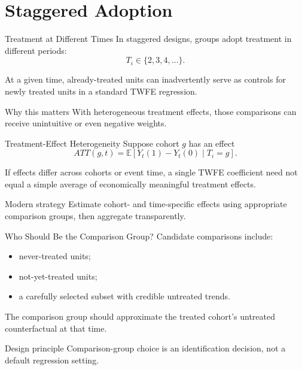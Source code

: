 \documentclass[aspectratio=169,11pt]{beamer}
\newcommand{\E}{\mathbb{E}}
\begin{document}
\section{Staggered Adoption}

\begin{frame}{Treatment at Different Times}
In staggered designs, groups adopt treatment in different periods:
\[
T_i\in\{2,3,4,\ldots\}.
\]

At a given time, already-treated units can inadvertently serve as controls for newly treated units in a standard TWFE regression.

\begin{alertblock}{Why this matters}
With heterogeneous treatment effects, those comparisons can receive unintuitive or even negative weights.
\end{alertblock}
\end{frame}

\begin{frame}{Treatment-Effect Heterogeneity}
Suppose cohort \(g\) has an effect
\[
ATT(g,t)
=
\E[Y_t(1)-Y_t(0)\mid T_i=g].
\]

If effects differ across cohorts or event time, a single TWFE coefficient need not equal a simple average of economically meaningful treatment effects.

\begin{block}{Modern strategy}
Estimate cohort- and time-specific effects using appropriate comparison groups, then aggregate transparently.
\end{block}
\end{frame}

\begin{frame}{Who Should Be the Comparison Group?}
Candidate comparisons include:
\begin{itemize}
\item never-treated units;
\item not-yet-treated units;
\item a carefully selected subset with credible untreated trends.
\end{itemize}

The comparison group should approximate the treated cohort's untreated counterfactual at that time.

\begin{alertblock}{Design principle}
Comparison-group choice is an identification decision, not a default regression setting.
\end{alertblock}
\end{frame}
\end{document}
